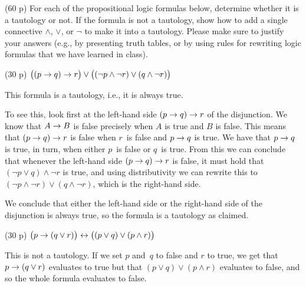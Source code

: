 \documentclass{jn-pset}
\begin{document}
\begin{problem}%
  \label{problem:logic}%
  (60 p)  
  For each of the propositional logic formulas below,
  determine whether it is a tautology or not.
  If the formula is not a tautology, show how to
  add a single connective
  $\land$, $\lor$, or $\lnot$
  to make it into a tautology.
  Please make sure to justify your answers
  (e.g., by presenting truth tables, or by using rules for rewriting logic formulas
  that we have learned in class).

  \begin{subproblem}%
    \label{problem:formula-1}%
    {(30 p)}
    {\ignorespaces}
    $
    \bigl(
    ( p \rightarrow q ) \rightarrow r 
    \bigr)
    \lor
    \bigl(
    (\lnot p \land \lnot r)
    \lor
    (q \land \lnot r)
    \bigr)
    $
  \end{subproblem}

\begin{solution}
  This formula is a tautology, i.e., it is always true.

  To see this, look first at the left-hand side
  $ ( p \rightarrow q ) \rightarrow r $
  of the disjunction.
  We know that
  $A \rightarrow B$
  is false precisely when
  $A$ is true and $B$ is false. This means that
  $    ( p \rightarrow q ) \rightarrow r $
  is false when
  $r$~is false and
  $p \rightarrow q$
  is true.
  We have that
  $p \rightarrow q$
  is true, in turn,
  when either
  $p$~is false or $q$~is true.
  From this we can conclude that whenever the left-hand side
  $ ( p \rightarrow q ) \rightarrow r $
  is false, it must hold that
  $
  (\lnot p \lor q) \land \lnot r
  $
  is true, and using distributivity we can rewrite this to 
  $
  (\lnot p \land \lnot r)
  \lor
  (q \land \lnot r)
  $,
  which is the right-hand side.

  We conclude that either the left-hand side or the right-hand side of
  the disjunction is always true, so the formula is a tautology as claimed.
\end{solution}

  \begin{subproblem}
    {(30 p)}
    {\ignorespaces}
    $
    \bigl(
    p \rightarrow (q \lor r)
    \bigr)
    \leftrightarrow
    \bigl(
    (p \lor q)
    \lor
    (p \land r)
    \bigr)
    $    
  \end{subproblem}

\begin{solution}
  This is not a tautology.
  If we set $p$ and~$q$ to false
  and $r$ to true, we get that
  $
  p \rightarrow (q \lor r)
  $
  evaluates to true but that
  $
  (p \lor q)
  \lor
  (p \land r)
  $    
  evaluates to false,
  and so the whole formula evaluates to false.


\end{solution}
\end{problem}
\end{document}
